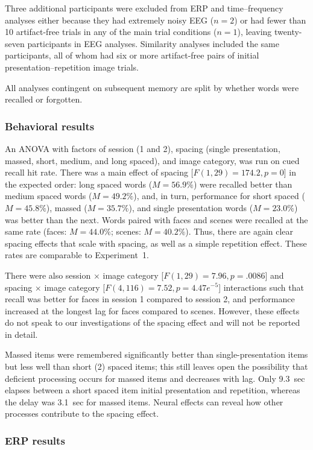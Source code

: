 Three additional participants were excluded from ERP and time--frequency analyses either because they had extremely noisy EEG ($n=2$) or had fewer than 10 artifact-free trials in any of the main trial conditions ($n=1$), leaving twenty-seven participants in EEG analyses.  Similarity analyses included the same participants, all of whom had six or more artifact-free pairs of initial presentation--repetition image trials.

All analyses contingent on subsequent memory are split by whether words were recalled or forgotten.

\subsubsection{Behavioral results}

An ANOVA with factors of session (1 and 2), spacing (single presentation, massed, short, medium, and long spaced), and image category, was run on cued recall hit rate.  There was a main effect of spacing [$F(1,29)=174.2, p=0$] in the expected order: long spaced words ($M=56.9\%$) were recalled better than medium spaced words ($M=49.2\%$), and, in turn, performance for short spaced ($M=45.8\%$), massed ($M=35.7\%$), and single presentation words ($M=23.0\%$) was better than the next.  Words paired with faces and scenes were recalled at the same rate (faces: $M=44.0\%$; scenes: $M=40.2\%$).  Thus, there are again clear spacing effects that scale with spacing, as well as a simple repetition effect. These rates are comparable to Experiment~1.

There were also session $\times$ image category [$F(1,29)=7.96, p=.0086$] and spacing $\times$ image category [$F(4,116)=7.52, p=4.47e^{-5}$] interactions such that recall was better for faces in session 1 compared to session 2, and performance increased at the longest lag for faces compared to scenes.  However, these effects do not speak to our investigations of the spacing effect and will not be reported in detail.

Massed items were remembered significantly better than single-presentation items but less well than short (2) spaced items; this still leaves open the possibility that deficient processing occurs for massed items and decreases with lag.  Only 9.3~sec elapses between a short spaced item initial presentation and repetition, whereas the delay was 3.1~sec for massed items.  Neural effects can reveal how other processes contribute to the spacing effect.

\subsubsection{ERP results}

